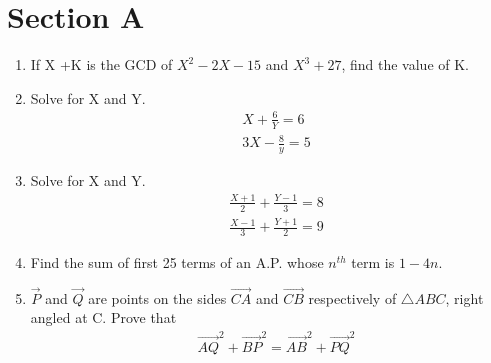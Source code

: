 \documentclass[journal,12pt,twocolumn]{IEEEtran}
\renewcommand\thesection{\arabic{section}}
\begin{document}
\section{Section A}
\renewcommand{\theequation}{\theenumi}
\begin{enumerate}[label=\thesection.\arabic*.,ref=\thesection.\theenumi]
\item If X +K is the GCD of $ X^2-2X-15 $ and $X^3+27$, find the value of K.
\item Solve for X and Y.\\ 
\begin{align}
&X+\displaystyle\frac{6}{Y}=6 \nonumber\\
&3X- \displaystyle\frac{8}{y}=5 \nonumber
 \end{align}
 
\item Solve for  X and Y.\\ 
\begin{align}
& \displaystyle\frac{X+1}{2}+\displaystyle\frac{Y-1}{3}=8 \nonumber\\
& \displaystyle\frac{X-1}{3}+\displaystyle\frac{Y+1}{2}=9 \nonumber
\end{align}

\item Find the sum of first 25 terms of an A.P. whose $n^{th} $ term is $1-4n$.
\item $\vec{P}$  and $\vec{Q}$ are points on the sides $\vec{CA}$ and $\vec{CB}$ respectively of $\triangle{ABC}$, right angled at C. Prove that
\begin{align}
&\vec{AQ}^2+ \vec{BP}^2= \vec{AB}^2+\vec{PQ}^2 \nonumber
\end{align}


\end{enumerate}
\end{document}
